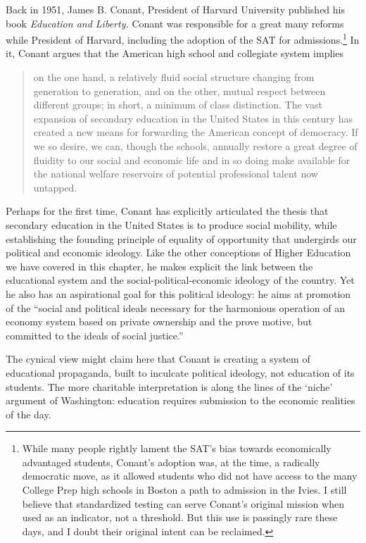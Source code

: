 Back in 1951, James B. Conant, President of Harvard University published his book \emph{Education and Liberty.} Conant was responsible for a great many reforms while President of Harvard, including the adoption of the SAT for admissions.\footnote{While many people rightly lament the SAT's bias towards economically advantaged students, Conant's adoption was, at the time, a radically democratic move, as it allowed students who did not have access to the many College Prep high schools in Boston a path to admission in the Ivies. I still believe that standardized testing can serve Conant's original mission when used as an indicator, not a threshold. But this use is passingly rare these days, and I doubt their original intent can be reclaimed.} In it, Conant argues that the American high school and collegiate system implies 

\begin{quote}

on the one hand, a relatively fluid social structure changing from generation to generation, and on the other, mutual respect between different groups; in short, a minimum of class distinction. The vast expansion of secondary education in the United States in this century has created a new means for forwarding the American concept of democracy. If we so desire, we can, though the schools, annually restore a great degree of fluidity to our social and economic life and in so doing make available for the national welfare reservoirs of potential professional talent now untapped. ~\citep[p. 56]{Conant:1953ut}
\end{quote}

Perhaps for the first time, Conant has explicitly articulated the thesis that secondary education in the United States is to produce social mobility, while establishing the founding principle of equality of opportunity that undergirds our political and economic ideology. Like the other conceptions of Higher Education we have covered in this chapter, he makes explicit the link between the educational system and the social-political-economic ideology of the country. Yet he also has an aspirational goal for this political ideology: he aims at promotion of the ``social and political ideals necessary for the harmonious operation of an economy system based on private ownership and the prove motive, but committed to the ideals of social justice.'' ~\citep[p. 56]{Conant:1953ut}

The cynical view might claim here that Conant is creating a system of educational propaganda, built to inculcate political ideology, not education of its students. The more charitable interpretation is along the lines of the `niche' argument of Washington: education requires submission to the economic realities of the day.

